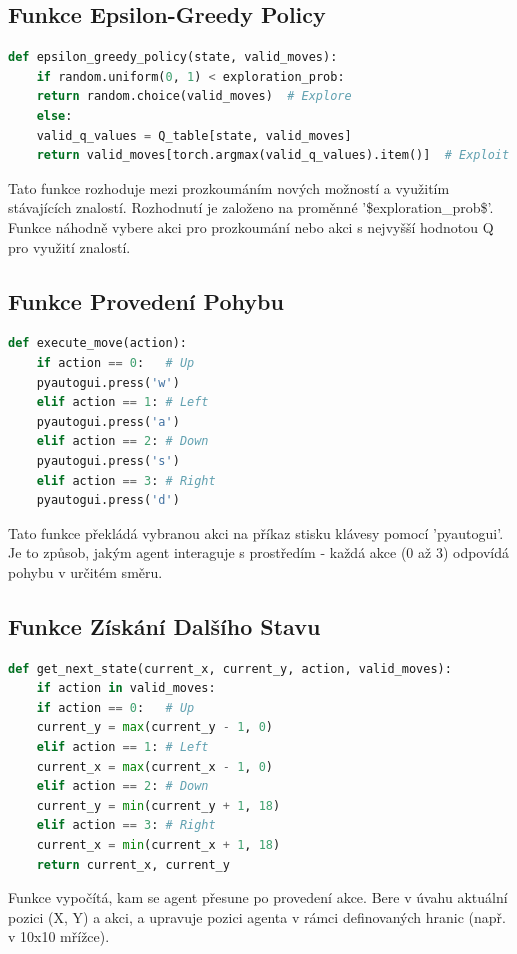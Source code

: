 \documentclass[12pt, a4paper,
twoside,        %
openright
]{report}
\begin{document}
\subsection{Funkce Epsilon-Greedy Policy}
\begin{lstlisting}[language=Python]
	def epsilon_greedy_policy(state, valid_moves):
	if random.uniform(0, 1) < exploration_prob:
	return random.choice(valid_moves)  # Explore
	else:
	valid_q_values = Q_table[state, valid_moves]
	return valid_moves[torch.argmax(valid_q_values).item()]  # Exploit
\end{lstlisting}
Tato funkce rozhoduje mezi prozkoumáním nových možností a využitím stávajících znalostí. Rozhodnutí je založeno na proměnné '\$exploration\_prob\$'. Funkce náhodně vybere akci pro prozkoumání nebo akci s nejvyšší hodnotou Q pro využití znalostí.

\newpage
\subsection{Funkce Provedení Pohybu}
\begin{lstlisting}[language=Python]
	def execute_move(action):
	if action == 0:   # Up
	pyautogui.press('w')
	elif action == 1: # Left
	pyautogui.press('a')
	elif action == 2: # Down
	pyautogui.press('s')
	elif action == 3: # Right
	pyautogui.press('d')
\end{lstlisting}
Tato funkce překládá vybranou akci na příkaz stisku klávesy pomocí 'pyautogui'. Je to způsob, jakým agent interaguje s prostředím - každá akce (0 až 3) odpovídá pohybu v určitém směru.

\subsection{Funkce Získání Dalšího Stavu}
\begin{lstlisting}[language=Python]
	def get_next_state(current_x, current_y, action, valid_moves):
	if action in valid_moves:
	if action == 0:   # Up
	current_y = max(current_y - 1, 0)
	elif action == 1: # Left
	current_x = max(current_x - 1, 0)
	elif action == 2: # Down
	current_y = min(current_y + 1, 18)
	elif action == 3: # Right
	current_x = min(current_x + 1, 18)
	return current_x, current_y
\end{lstlisting}
Funkce vypočítá, kam se agent přesune po provedení akce. Bere v úvahu aktuální pozici (X, Y) a akci, a upravuje pozici agenta v rámci definovaných hranic (např. v 10x10 mřížce).

\newpage
\end{document}
